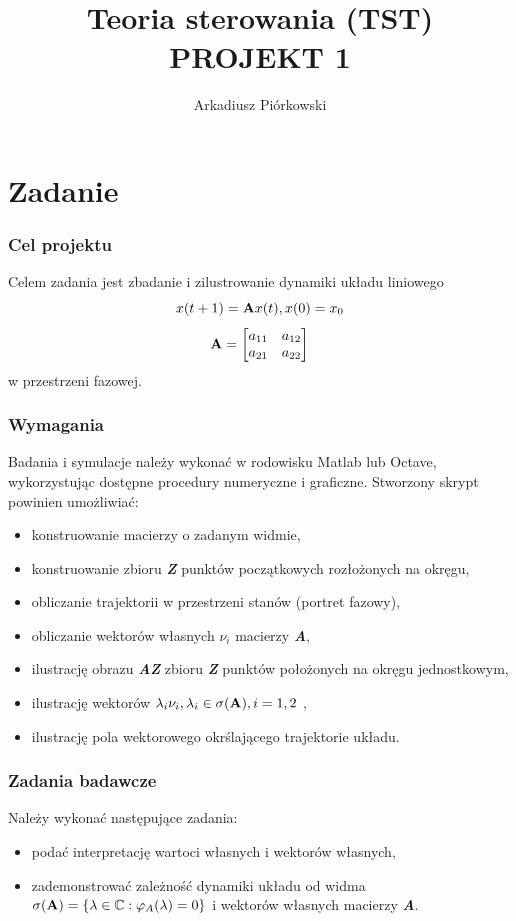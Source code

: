 \documentclass{article}
\title{Teoria sterowania (TST)\\ PROJEKT 1}
\author{Arkadiusz Piórkowski}
\begin{document}
\maketitle

\section*{Zadanie}

\subsubsection*{Cel projektu}
Celem zadania jest zbadanie i zilustrowanie dynamiki układu liniowego
\[
x(t+1) = \bold{A}x(t), x(0)=x_0
\]
\[
\bold{A=\begin{bmatrix*}[r]
  a_{11} & a_{12} \\
  a_{21} & a_{22}
 \end{bmatrix*}}
\]
w przestrzeni fazowej.
\subsubsection*{Wymagania}
Badania i symulacje należy wykonać w rodowisku Matlab lub Octave, wykorzystując dostępne procedury numeryczne i graficzne. Stworzony skrypt powinien umożliwiać:
\begin{itemize}
\item konstruowanie macierzy o zadanym widmie,
\item konstruowanie zbioru \textbf{\textit{Z}} punktów początkowych rozłożonych na okręgu,
\item obliczanie trajektorii w przestrzeni stanów (portret fazowy),
\item obliczanie wektorów własnych $\nu_i$ macierzy \textbf{\textit{A}},
\item ilustrację obrazu \textbf{\textit{AZ}} zbioru \textbf{\textit{Z}} punktów położonych na okręgu jednostkowym,
\item ilustrację wektorów $\lambda_i\nu_i , \lambda_i \in \sigma(\bold {A}) , i =1,2$ ,
\item ilustrację pola wektorowego okr\'slającego trajektorie układu.
\end{itemize}
\subsubsection*{Zadania badawcze}
Należy wykonać następujące zadania:
\begin{itemize}
\item podać interpretację wartoci własnych i wektorów własnych,
\item zademonstrować zależno\'sć dynamiki układu od widma $\sigma(\bold{A}) = \{ \lambda \in \mathbb{C} : \varphi_A(\lambda) = 0 \}$ i wektorów własnych macierzy \textbf{\textit{A}}.
\end{itemize}
\end{document}
